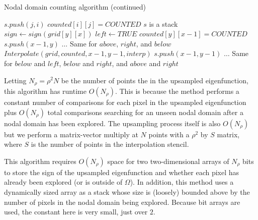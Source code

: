 \documentclass{report}
\begin{document}
\clearpage
\begin{algorithm}
  \ContinuedFloat
  \caption{Nodal domain counting algorithm (continued)}
  \begin{algorithmic}

        \State $s.push(j,i)$
        \State $counted[i][j] = COUNTED$
        \Comment $s$ is a stack
            \State $sign \gets sign(grid[y][x])$
                    \State $left \gets TRUE$
                        \State $counted[y][x-1] = COUNTED$
                        \State $s.push(x-1,y)$
                    \EndIf
                \EndIf
            \EndIf
            \State $\ldots$ \Comment Same for $above$, $right$, and $below$
                      \State $Interpolate(grid, counted, x-1, y-1, interp)$
                  \EndIf
                      $s.push(x-1,y-1)$
                  \EndIf
                \EndIf
            \EndIf
            \State $\ldots$ \Comment Same for $below$ and $left$, $below$ and $right$, and $above$ and $right$
        \EndWhile
    \EndFunction
  \end{algorithmic}
\end{algorithm}

Letting $N_\rho = \rho^{2} N$ be the number of points the in the upsampled eigenfunction, this algorithm has runtime $O(N_\rho)$. This is because the method performs a constant number of comparisons for each pixel in the upsampled eigenfunction plus $O(N_{\rho})$ total comparisons searching for an unseen nodal domain after a nodal domain has been explored. The upsampling process itself is also $O(N_{\rho})$ but we perform a matrix-vector multiply at $N$ points with a $\rho^{2}$ by $S$ matrix, where $S$ is the number of points in the interpolation stencil.

This algorithm requires $O(N_{\rho})$ space for two two-dimensional arrays of $N_\rho$ bits to store the sign of the upsampled eigenfunction and whether each pixel has already been explored (or is outside of $\Omega$). In addition, this method uses a dynamically sized array as a stack whose size is (loosely) bounded above by the number of pixels in the nodal domain being explored. Because bit arrays are used, the constant here is very small, just over $2$.
\end{document}
